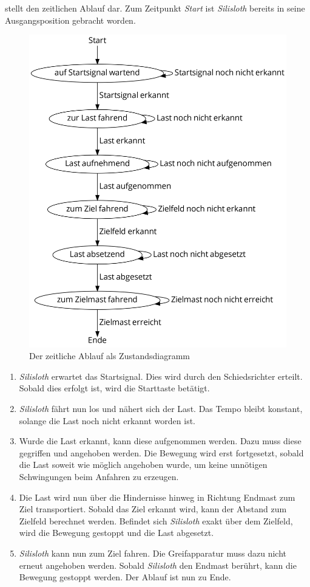  stellt den zeitlichen Ablauf dar. Zum Zeitpunkt \textit{Start} ist \textit{Silisloth} bereits in seine Ausgangsposition gebracht worden.

\begin{figure}
    \includegraphics[width=\linewidth]{graphs/status.png}
    \caption{Der zeitliche Ablauf als Zustandsdiagramm}
    \label{fig:zeitlicher-ablauf}
\end{figure}

\begin{enumerate}
    \item \textit{Silisloth} erwartet das Startsignal. Dies wird durch den Schiedsrichter erteilt. Sobald dies erfolgt ist, wird die Starttaste betätigt.
    \item \textit{Silisloth} fährt nun los und nähert sich der Last. Das Tempo bleibt konstant, solange die Last noch nicht erkannt worden ist.
    \item Wurde die Last erkannt, kann diese aufgenommen werden. Dazu muss diese gegriffen und angehoben werden. Die Bewegung wird erst fortgesetzt, sobald die Last soweit wie möglich angehoben wurde, um keine unnötigen Schwingungen beim Anfahren zu erzeugen.
    \item Die Last wird nun über die Hindernisse hinweg in Richtung Endmast zum Ziel transportiert. Sobald das Ziel erkannt wird, kann der Abstand zum Zielfeld berechnet werden. Befindet sich \textit{Silisloth} exakt über dem Zielfeld, wird die Bewegung gestoppt und die Last abgesetzt.
    \item \textit{Silisloth} kann nun zum Ziel fahren. Die Greifapparatur muss dazu nicht erneut angehoben werden. Sobald \textit{Silisloth} den Endmast berührt, kann die Bewegung gestoppt werden. Der Ablauf ist nun zu Ende.
\end{enumerate}


